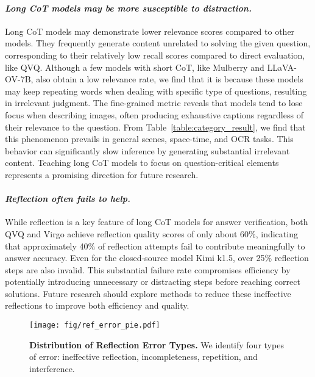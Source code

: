 \paragraph{\textit{Long CoT models may be more susceptible to distraction.}} 
Long CoT models may demonstrate lower relevance scores compared to other models. They frequently generate content unrelated to solving the given question, corresponding to their relatively low recall scores compared to direct evaluation, like QVQ. Although a few models with short CoT, like Mulberry and LLaVA-OV-7B, also obtain a low relevance rate, we find that it is because these models may keep repeating words when dealing with specific type of questions, resulting in irrelevant judgment. The fine-grained metric reveals that models tend to lose focus when describing images, often producing exhaustive captions regardless of their relevance to the question. From Table~\ref{table:category_result}, we find that this phenomenon prevails in general scenes, space-time, and OCR tasks. This behavior can significantly slow inference by generating substantial irrelevant content. Teaching long CoT models to focus on question-critical elements represents a promising direction for future research.


\paragraph{\textit{Reflection often fails to help.}} 
While reflection is a key feature of long CoT models for answer verification, both QVQ and Virgo achieve reflection quality scores of only about 60\%, indicating that approximately 40\% of reflection attempts fail to contribute meaningfully to answer accuracy. Even for the closed-source model Kimi k1.5, over 25\% reflection steps are also invalid. This substantial failure rate compromises efficiency by potentially introducing unnecessary or distracting steps before reaching correct solutions. Future research should explore methods to reduce these ineffective reflections to improve both efficiency and quality.

\begin{figure}[t]
\begin{center}
\vspace{0.2cm}
\centerline{\texttt{[image: fig/ref\_error\_pie.pdf]}}
\caption{\textbf{Distribution of Reflection Error Types.} We identify four types of error: ineffective reflection, incompleteness, repetition, and interference.}
\label{fig:ref_error_distribution}
\end{center}
\vspace{-0.6cm}
\end{figure}

